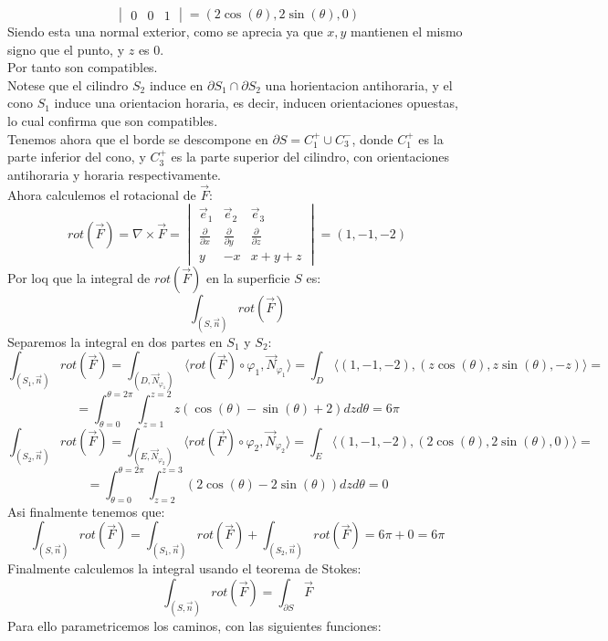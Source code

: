 {$$\begin{vmatrix}
        0 & 0 & 1
    \end{vmatrix} = \left( 2\cos(\theta), 2\sin(\theta), 0 \right)$$
    Siendo esta una normal exterior, como se aprecia ya que $x,y$ mantienen el mismo signo que el punto, y $z$ es $0$.\\
    Por tanto son compatibles.\\
    Notese que el cilindro $S_2$ induce en $\partial S_1 \cap \partial S_2$ una horientacion antihoraria, y el cono $S_1$ induce una orientacion horaria, es decir, inducen orientaciones opuestas, lo cual confirma que son compatibles.\\
    Tenemos ahora que el borde se descompone en $\partial S = C_1^+ \cup C_3^-$, donde $C_1^+$ es la parte inferior del cono, y $C_3^+$ es la parte superior del cilindro, con orientaciones antihoraria y horaria respectivamente.\\
    Ahora calculemos el rotacional de $\vec{F}$:
    $$ rot(\vec{F}) = \nabla \times \vec{F} = \begin{vmatrix}
        \vec{e}_1 & \vec{e}_2 & \vec{e}_3 \\
        \frac{\partial}{\partial x} & \frac{\partial}{\partial y} & \frac{\partial}{\partial z} \\
        y & -x & x + y + z
    \end{vmatrix} = \left( 1, -1, -2 \right)$$
    Por loq que la integral de $rot(\vec{F})$ en la superficie $S$ es:
    $$ \int_{(S, \vec{n})} rot(\vec{F})$$
    Separemos la integral en dos partes en $S_1$ y $S_2$:
    $$ \int_{(S_1, \vec{n})} rot(\vec{F}) = \int_{(D, \vec{N}_{\varphi_1})} \langle rot(\vec{F}) \circ \varphi_1, \vec{N}_{\varphi_1} \rangle = \int_{D} \langle (1,-1,-2), (z\cos(\theta), z\sin(\theta), -z) \rangle =$$
    $$ = \int_{\theta = 0}^{\theta = 2\pi} \int_{z=1}^{z=2} z(\cos(\theta) - \sin(\theta) + 2) dz d\theta = 6\pi$$
    $$ \int_{(S_2, \vec{n})} rot(\vec{F}) = \int_{(E, \vec{N}_{\varphi_2})} \langle rot(\vec{F}) \circ \varphi_2, \vec{N}_{\varphi_2} \rangle = \int_{E} \langle (1,-1,-2), (2\cos(\theta), 2\sin(\theta), 0) \rangle =$$
    $$ = \int_{\theta = 0}^{\theta = 2\pi} \int_{z=2}^{z=3} (2\cos(\theta) - 2\sin(\theta)) dz d\theta = 0$$
    Asi finalmente tenemos que:
    $$ \int_{(S, \vec{n})} rot(\vec{F}) = \int_{(S_1, \vec{n})} rot(\vec{F}) + \int_{(S_2, \vec{n})} rot(\vec{F}) = 6\pi + 0 = 6\pi$$
    Finalmente calculemos la integral usando el teorema de Stokes:
    $$ \int_{(S, \vec{n})} rot(\vec{F}) = \int_{\partial S} \vec{F} $$
    Para ello parametricemos los caminos, con las siguientes funciones:
}
